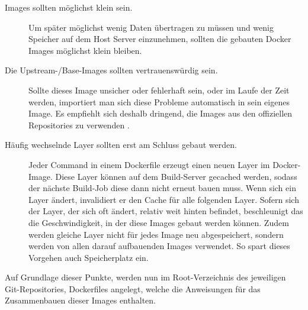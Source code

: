 \begin{description}
  \item[Images sollten möglichst klein sein.] Um später möglichst wenig Daten
  übertragen zu müssen und wenig Speicher auf dem Host Server einzunehmen,
  sollten die gebauten Docker Images möglichst klein bleiben.
  \item[Die Upstream-/Base-Images sollten vertrauenswürdig sein.]
  Sollte dieses Image unsicher oder fehlerhaft sein, oder im Laufe der Zeit
  werden, importiert man sich diese Probleme automatisch in sein eigenes Image.
  Es empfiehlt sich deshalb dringend, die Images aus den offiziellen Repositories
  zu verwenden \cite{DockerHub}.
  \item[Häufig wechselnde Layer sollten erst am Schluss gebaut werden.]
  Jeder Command in einem Dockerfile erzeugt einen neuen Layer im Docker-Image.
  Diese Layer können auf dem Build-Server gecached werden, sodass der nächste
  Build-Job diese dann nicht erneut bauen muss.
  Wenn sich ein Layer ändert, invalidiert er den Cache für alle folgenden Layer.
  Sofern sich der Layer, der sich oft ändert, relativ weit hinten befindet,
  beschleunigt das die Geschwindigkeit, in der diese Images gebaut werden können.
  Zudem werden gleiche Layer nicht für jedes Image neu abgespeichert, sondern
  werden von allen darauf aufbauenden Images verwendet. So spart dieses Vorgehen
  auch Speicherplatz ein.

\end{description}

Auf Grundlage dieser Punkte, werden nun im Root-Verzeichnis des jeweiligen
Git-Repositories, Dockerfiles angelegt,
welche die Anweisungen für das Zusammenbauen dieser Images enthalten.

\newcommand{\specialcell}[2][c]{%
  \begin{tabular}[#1]{@{}l@{}}#2\end{tabular}}

